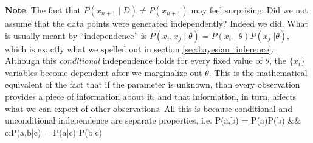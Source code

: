 \begin{footnotesize}
{\bf Note}: The fact that $P(x_{n+1}\;|\;D) \neq P(x_{n+1})$ may feel surprising. Did we not assume that the data points were generated independently? Indeed we did. What is usually meant by ``independence'' is $P(x_i, x_j\;|\;\theta) = P(x_i\;|\;\theta) P(x_j\;|\theta)$, which is exactly what we spelled out in section \ref{sec:bayesian_inference}. Although this \emph{conditional} independence holds for every fixed value of $\theta$, the $\{x_i\}$ variables become dependent after we marginalize out $\theta$. This is the mathematical equivalent of the fact that if the parameter is unknown, than every observation provides a piece of information about it, and that information, in turn, affects what we can expect of other observations. All this is because conditional and unconditional independence are separate properties, i.e.
\ba
	P(a,b) = P(a)P(b) &\quad \not\!\Leftrightarrow \quad& \forall c:\;P(a,b\;|\;c) = P(a\;|\;c) P(b\;|\;c)
\ea
\end{footnotesize}

\newpage
{}

